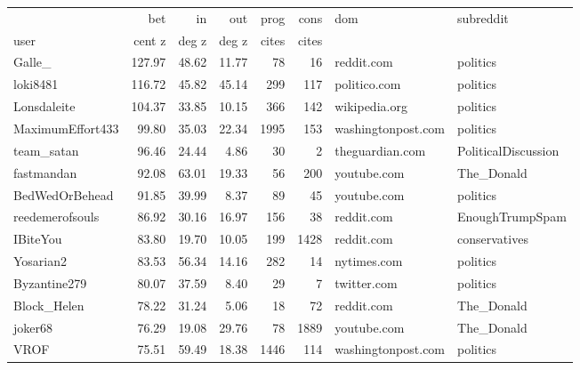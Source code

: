 \begin{tabular}{lrrrrrll}
\toprule
{} & bet & in & out & prog & cons & dom & subreddit \\
user & cent z & deg z & deg z & cites & cites & & \\
\midrule
Galle\_           &      127.97 &     48.62 &      11.77 &          78 &          16 &             reddit.com &             politics \\
loki8481         &      116.72 &     45.82 &      45.14 &         299 &         117 &           politico.com &             politics \\
Lonsdaleite      &      104.37 &     33.85 &      10.15 &         366 &         142 &          wikipedia.org &             politics \\
MaximumEffort433 &       99.80 &     35.03 &      22.34 &        1995 &         153 &     washingtonpost.com &             politics \\
team\_satan       &       96.46 &     24.44 &       4.86 &          30 &           2 &        theguardian.com &  PoliticalDiscussion \\
fastmandan       &       92.08 &     63.01 &      19.33 &          56 &         200 &            youtube.com &           The\_Donald \\
BedWedOrBehead   &       91.85 &     39.99 &       8.37 &          89 &          45 &            youtube.com &             politics \\
reedemerofsouls  &       86.92 &     30.16 &      16.97 &         156 &          38 &             reddit.com &      EnoughTrumpSpam \\
IBiteYou         &       83.80 &     19.70 &      10.05 &         199 &        1428 &             reddit.com &        conservatives \\
Yosarian2        &       83.53 &     56.34 &      14.16 &         282 &          14 &            nytimes.com &             politics \\
Byzantine279     &       80.07 &     37.59 &       8.40 &          29 &           7 &            twitter.com &             politics \\
Block\_Helen      &       78.22 &     31.24 &       5.06 &          18 &          72 &             reddit.com &           The\_Donald \\
joker68          &       76.29 &     19.08 &      29.76 &          78 &        1889 &            youtube.com &           The\_Donald \\
VROF             &       75.51 &     59.49 &      18.38 &        1446 &         114 &     washingtonpost.com &             politics \\

\end{tabular}
